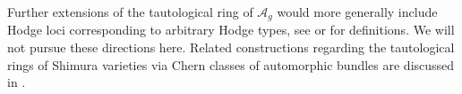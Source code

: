 \documentclass[11pt]{amsart}
\theoremstyle{definition}
\newtheorem{definition}[thm]{Definition}
\newcommand{\X}{\mathcal{X}}
\newcommand{\qq}{\mathbb{Q}}
\newcommand{\A}{\mathcal{A}}
\newcommand{\CH}{\mathsf{CH}}
\begin{document}

Further extensions of the tautological ring of $\A_g$ would more generally include  Hodge loci corresponding to arbitrary Hodge types, see \cite [Section 3]{MO} or \cite{GGK, V} for definitions. We will not pursue these directions here. Related constructions regarding the tautological rings of Shimura varieties via Chern classes of automorphic bundles are discussed in \cite {TZ}. 
\end{document}
